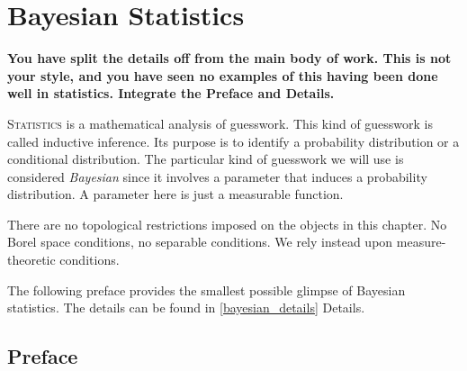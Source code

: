 \documentclass[
twoside=true,
paper=letter,
fontsize=9pt,
pagesize=auto,
leqno,
openany,
headsepline,
overfullrule,
]{scrbook}
\theoremstyle{plain}
\theoremstyle{plain}
\theoremstyle{definition}
\theoremstyle{bfnoteitalic}
\theoremstyle{bfnoteroman}
\begin{document}
\chapter{Bayesian Statistics}\label{bayesian_statistics}
\textbf{You have split the details off from the main body of work.  This is not your style, and you have seen no examples of this having been done well in statistics.  Integrate the Preface and Details.}

\lettrine{S}{tatistics} is a mathematical analysis of guesswork. This kind of guesswork is called inductive inference.
Its purpose is to identify a probability distribution or a conditional distribution. The particular kind of guesswork we will use is considered \emph{Bayesian} since it involves a parameter that induces a  probability distribution. A parameter here is just a measurable function.

There are no topological restrictions imposed on the objects in this chapter. No Borel space conditions, no separable conditions.  We rely instead upon measure-theoretic conditions.

The following preface provides the smallest possible glimpse of Bayesian statistics.
The details can be found in \textsf{\ref{bayesian_details} Details}.


\section{Preface}\label{bayesian_preface}
\end{document}

